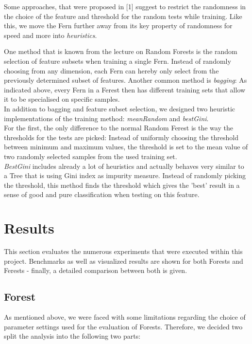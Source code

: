 \documentclass[twocolumn]{article}
\begin{document}
Some approaches, that were proposed in [1] suggest to restrict the randomness in the choice of the feature and threshold for the random tests while training. Like this, we move the Fern further away from its key property of randomness for speed and more into \textit{heuristics}.

One method that is known from the lecture on Random Forests is the random selection of feature subsets when training a single Fern. Instead of randomly choosing from any dimension, each Fern can hereby only select from the previously determined subset of features. Another common method is \textit{bagging}: As indicated above, every Fern in a Ferest then has different training sets that allow it to be specialised on specific samples.\\
In addition to bagging and feature subset selection, we designed two heuristic implementations of the training method: \textit{meanRandom} and \textit{bestGini}.\\
For the first, the only difference to the normal Random Ferest is the way the thresholds for the tests are picked: Instead of uniformly choosing the threshold between minimum and maximum values, the threshold is set to the mean value of two randomly selected samples from the used training set.\\
\textit{BestGini} includes already a lot of heuristics and actually behaves very similar to a Tree that is using Gini index as impurity measure. Instead of randomly picking the threshold, this method finds the threshold which gives the 'best' result in a sense of good and pure classification when testing on this feature.


\section{Results}

This section evaluates the numerous experiments that were executed within this project. Benchmarks as well as visualized results are shown for both Forests and Ferests - finally, a detailed comparison between both is given.

\subsection{Forest}
As mentioned above, we were faced with some limitations regarding the choice of parameter settings used for the evaluation of Forests. Therefore, we decided two split the analysis into the following two parts:
\end{document}
